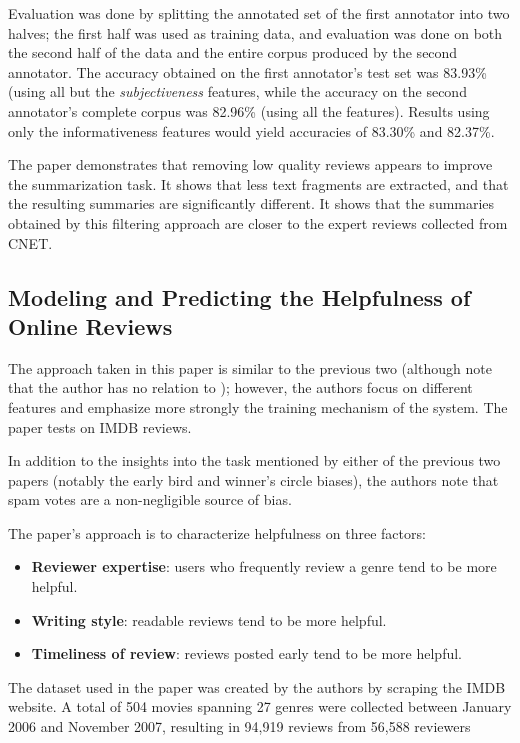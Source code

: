 \documentclass[12pt,letterpaper]{article}
\begin{document}
Evaluation was done by splitting the annotated set of the first annotator into two halves;
	the first half was used as training data, and evaluation was done on both the second
	half of the data and the entire corpus produced by the second annotator.
The accuracy obtained on the first annotator's test set was 83.93\% (using all but
	the {\em subjectiveness} features, while the accuracy
	on the second annotator's complete corpus was 82.96\% (using all the features).
Results using only the informativeness features would yield accuracies of 83.30\% and 82.37\%.

The paper demonstrates that removing low quality reviews appears to improve the summarization task.
It shows that less text fragments are extracted, and that the resulting summaries are significantly different.
It shows that the summaries obtained by this filtering approach are closer to the expert reviews
	collected from CNET.

\subsection{Modeling and Predicting the Helpfulness of Online Reviews \cite{2008liu-helpfulness}}

The approach taken in this paper is similar to the previous two (although note that the author
	has no relation to ); however, the authors focus on different features
	and emphasize more strongly the training mechanism of the system.
The paper tests on IMDB reviews.

In addition to the insights into the task mentioned by either of the previous two papers (notably the early
	bird and winner's circle biases), the authors note that spam votes are a non-negligible source of bias.

The paper's approach is to characterize helpfulness on three factors:
\begin{itemize}
	\item {\bf Reviewer expertise}: users who frequently review a genre tend to be more helpful.
	\item {\bf Writing style}: readable reviews tend to be more helpful.
	\item {\bf Timeliness of review}: reviews posted early tend to be more helpful.
\end{itemize}

The dataset used in the paper was created by the authors by scraping the IMDB website.
A total of 504 movies spanning 27 genres were collected between January 2006 and November 2007,
	resulting in 94,919 reviews from 56,588 reviewers
\end{document}
